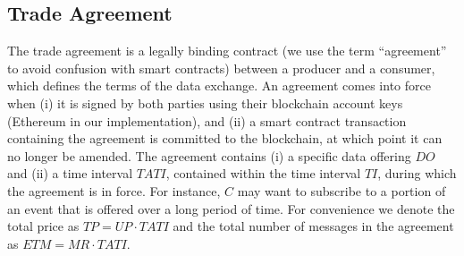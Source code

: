 \documentclass[letterpaper, 10 pt, conference]{ieeeconf}  %
\newcommand{\ti}{\ensuremath{\mathit{TI}}}
\newcommand{\mr}{\ensuremath{\mathit{MR}}}
\newcommand{\up}{\ensuremath{\mathit{UP}}}
\newcommand{\doff}{\ensuremath{\mathit{DO}}}
\newcommand{\tati}{\ensuremath{\mathit{TATI}}}
\newcommand{\etm}{\ensuremath{\mathit{ETM}}}
\newcommand{\tp}{\ensuremath{\mathit{TP}}}
\begin{document}
%
%
%
%

%


\subsection{Trade Agreement} \label{sec:agreement}

The trade agreement is a legally binding contract (we use the term ``agreement'' to avoid confusion with smart contracts) between a producer and a consumer, which defines the terms of the data exchange.
An agreement comes into force when (i) it is signed by both parties using their blockchain account keys (Ethereum in our implementation), and (ii) a smart contract transaction containing the agreement is committed to the blockchain, at which point it can no longer be amended.
The agreement contains (i) a specific data offering \doff{} and (ii) a time interval $\tati$, contained within the time interval \ti, during which the agreement is in force.
For instance, $C$ may want to subscribe to a portion of an event that is offered over a long period of time.
For convenience we denote the total price as $\tp = \up \cdot \tati$ and the total number of messages in the agreement as $\etm = \mr \cdot \tati$.

%
%
%
\end{document}

